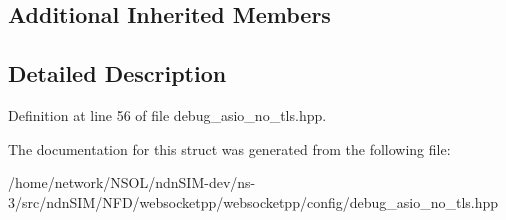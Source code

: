 \subsection*{Additional Inherited Members}


\subsection{Detailed Description}


Definition at line 56 of file debug\+\_\+asio\+\_\+no\+\_\+tls.\+hpp.



The documentation for this struct was generated from the following file\+:\begin{DoxyCompactItemize}
\item 
/home/network/\+N\+S\+O\+L/ndn\+S\+I\+M-\/dev/ns-\/3/src/ndn\+S\+I\+M/\+N\+F\+D/websocketpp/websocketpp/config/debug\+\_\+asio\+\_\+no\+\_\+tls.\+hpp\end{DoxyCompactItemize}

